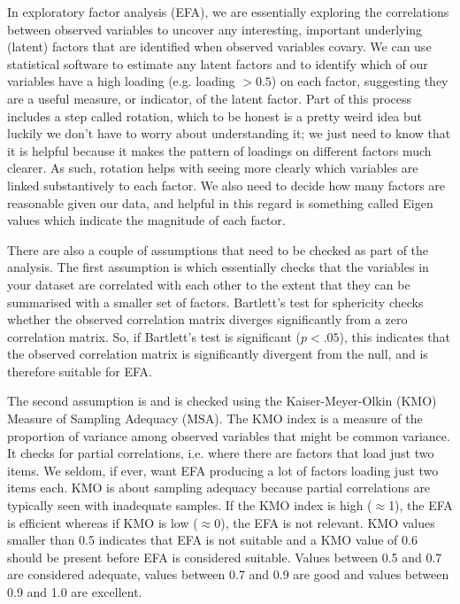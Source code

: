 In exploratory factor analysis (EFA), we are essentially exploring the correlations between observed variables to uncover any interesting, important underlying (latent) factors that are identified when observed variables covary. We can use statistical software to estimate any latent factors and to identify which of our variables have a high loading (e.g. loading $>0.5$) on each factor, suggesting they are a useful measure, or indicator, of the latent factor. Part of this process includes a step called rotation, which to be honest is a pretty weird idea but luckily we don’t have to worry about understanding it; we just need to know that it is helpful because it makes the pattern of loadings on different factors much clearer. As such, rotation helps with seeing more clearly which variables are linked substantively to each factor. We also need to decide how many factors are reasonable given our data, and helpful in this regard is something called Eigen values which indicate the magnitude of each factor.


There are also a couple of assumptions that need to be checked as part of the analysis. The first assumption is  which essentially checks that the variables in your dataset are correlated with each other to the extent that they can be summarised with a smaller set of factors. Bartlett’s test for sphericity checks whether the observed correlation matrix diverges significantly from a zero correlation matrix. So, if Bartlett’s test is significant ($p<.05$), this indicates that the observed correlation matrix is significantly divergent from the null, and is therefore suitable for EFA. 

The second assumption is  and is checked using the Kaiser-Meyer-Olkin (KMO) Measure of Sampling Adequacy (MSA). The KMO index is a measure of the proportion of variance among observed variables that might be common variance. It checks for partial correlations, i.e. where there are factors that load just two items. We seldom, if ever, want EFA producing a lot of factors loading just two items each. KMO is about sampling adequacy because partial correlations are typically seen with inadequate samples.  If the KMO index is high ($\approx$1), the EFA is efficient whereas if KMO is low ($\approx$0), the EFA is not relevant. KMO values smaller than 0.5 indicates that EFA is not suitable and a KMO value of 0.6 should be present before EFA is considered suitable. Values between 0.5 and 0.7 are considered adequate, values between 0.7 and 0.9 are good and values between 0.9 and 1.0 are excellent.

